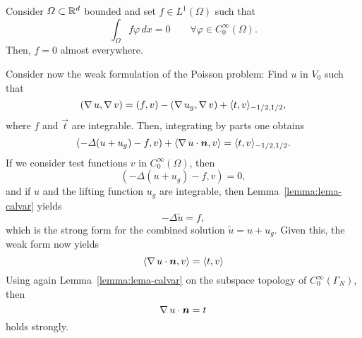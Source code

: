 \begin{lemma}\label{lemma:lema-calvar}
    Consider $\Omega\subset \mathbb{R}^d$ bounded and set $f\in L^1(\Omega)$ such that
        \begin{equation*}
\int_\Omega f\varphi\,dx = 0 \qquad \forall \varphi \in C_0^\infty(\Omega).
\end{equation*}
    Then, $f=0$ almost everywhere.
\end{lemma}

Consider now the weak formulation of the Poisson problem: Find $u$ in $V_0$ such that 
    \begin{equation*}
(\operatorname{\nabla} u, \operatorname{\nabla} v) = (f, v) - (\operatorname{\nabla} u_g, \operatorname{\nabla} v) + \langle t, v\rangle_{-1/2, 1/2},
\end{equation*}
    where $f$ and $\vec t$ are integrable. Then, integrating by parts one obtains
    \begin{equation*}
(-\Delta (u+u_g) - f, v)+\langle \grad u \cdot \vec n, v\rangle = \langle t, v\rangle_{-1/2,1/2}.
\end{equation*}
    If we consider test functions $v$ in $C_0^\infty(\Omega)$, then 
    \begin{equation*}
(-\Delta (u+u_g) - f, v) = 0,
\end{equation*}
    and if $u$ and the lifting function $u_g$ are integrable, then Lemma~\ref{lemma:lema-calvar} yields
    \begin{equation*}
-\Delta \tilde u = f,
\end{equation*}
    which is the strong form for the combined solution $\tilde u= u + u_g$. Given this, the weak form now yields
    \begin{equation*}
\langle \grad u \cdot \vec n, v\rangle = \langle t, v\rangle
\end{equation*}
    Using again Lemma~\ref{lemma:lema-calvar} on the subspace topology of $C_0^\infty(\Gamma_N)$, then
    \begin{equation*}
\grad u\cdot \vec n = t
\end{equation*}
    holds strongly. 


